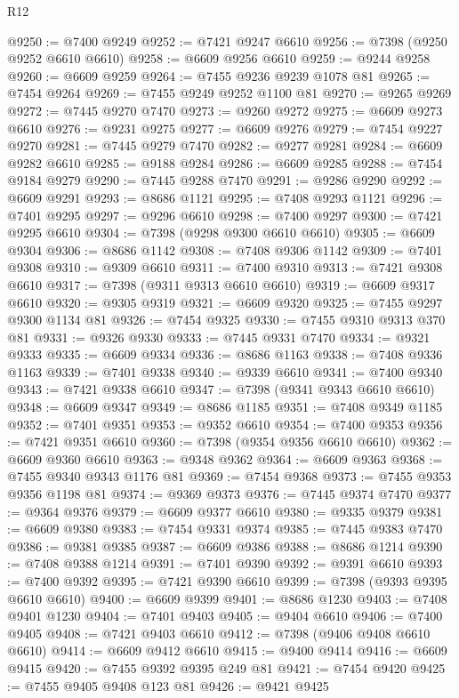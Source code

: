 \begin{lexlean}{R12}
\begin{coremodule}
{{{{{{{{{{{{{{{{{{{{{{{{{{{{{{{{{{{{{{{{{{{{{{{{{{{{{{{{{{{{{{{{{{{{{{{{{{{{{{{{{{@9250 := @7400 @9249
@9252 := @7421 @9247 @6610
@9256 := @7398 (@9250 @9252 @6610 @6610)
@9258 := @6609 @9256 @6610
@9259 := @9244 @9258
@9260 := @6609 @9259
@9264 := @7455 @9236 @9239 @1078 @81
@9265 := @7454 @9264
@9269 := @7455 @9249 @9252 @1100 @81
@9270 := @9265 @9269
@9272 := @7445 @9270 @7470
@9273 := @9260 @9272
@9275 := @6609 @9273 @6610
@9276 := @9231 @9275
@9277 := @6609 @9276
@9279 := @7454 @9227 @9270
@9281 := @7445 @9279 @7470
@9282 := @9277 @9281
@9284 := @6609 @9282 @6610
@9285 := @9188 @9284
@9286 := @6609 @9285
@9288 := @7454 @9184 @9279
@9290 := @7445 @9288 @7470
@9291 := @9286 @9290
@9292 := @6609 @9291
@9293 := @8686 @1121
@9295 := @7408 @9293 @1121
@9296 := @7401 @9295
@9297 := @9296 @6610
@9298 := @7400 @9297
@9300 := @7421 @9295 @6610
@9304 := @7398 (@9298 @9300 @6610 @6610)
@9305 := @6609 @9304
@9306 := @8686 @1142
@9308 := @7408 @9306 @1142
@9309 := @7401 @9308
@9310 := @9309 @6610
@9311 := @7400 @9310
@9313 := @7421 @9308 @6610
@9317 := @7398 (@9311 @9313 @6610 @6610)
@9319 := @6609 @9317 @6610
@9320 := @9305 @9319
@9321 := @6609 @9320
@9325 := @7455 @9297 @9300 @1134 @81
@9326 := @7454 @9325
@9330 := @7455 @9310 @9313 @370 @81
@9331 := @9326 @9330
@9333 := @7445 @9331 @7470
@9334 := @9321 @9333
@9335 := @6609 @9334
@9336 := @8686 @1163
@9338 := @7408 @9336 @1163
@9339 := @7401 @9338
@9340 := @9339 @6610
@9341 := @7400 @9340
@9343 := @7421 @9338 @6610
@9347 := @7398 (@9341 @9343 @6610 @6610)
@9348 := @6609 @9347
@9349 := @8686 @1185
@9351 := @7408 @9349 @1185
@9352 := @7401 @9351
@9353 := @9352 @6610
@9354 := @7400 @9353
@9356 := @7421 @9351 @6610
@9360 := @7398 (@9354 @9356 @6610 @6610)
@9362 := @6609 @9360 @6610
@9363 := @9348 @9362
@9364 := @6609 @9363
@9368 := @7455 @9340 @9343 @1176 @81
@9369 := @7454 @9368
@9373 := @7455 @9353 @9356 @1198 @81
@9374 := @9369 @9373
@9376 := @7445 @9374 @7470
@9377 := @9364 @9376
@9379 := @6609 @9377 @6610
@9380 := @9335 @9379
@9381 := @6609 @9380
@9383 := @7454 @9331 @9374
@9385 := @7445 @9383 @7470
@9386 := @9381 @9385
@9387 := @6609 @9386
@9388 := @8686 @1214
@9390 := @7408 @9388 @1214
@9391 := @7401 @9390
@9392 := @9391 @6610
@9393 := @7400 @9392
@9395 := @7421 @9390 @6610
@9399 := @7398 (@9393 @9395 @6610 @6610)
@9400 := @6609 @9399
@9401 := @8686 @1230
@9403 := @7408 @9401 @1230
@9404 := @7401 @9403
@9405 := @9404 @6610
@9406 := @7400 @9405
@9408 := @7421 @9403 @6610
@9412 := @7398 (@9406 @9408 @6610 @6610)
@9414 := @6609 @9412 @6610
@9415 := @9400 @9414
@9416 := @6609 @9415
@9420 := @7455 @9392 @9395 @249 @81
@9421 := @7454 @9420
@9425 := @7455 @9405 @9408 @123 @81
@9426 := @9421 @9425
}}}}}}}}}}}}}}}}}}}}}}}}}}}}}}}}}}}}}}}}}}}}}}}}}}}}}}}}}}}}}}}}}}}}}}}}}}}}}}}}}}
\end{coremodule}
\end{lexlean}
